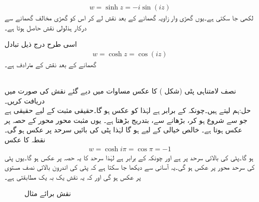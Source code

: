 \begin{align}\label{مساوات_نقش_ہذلولی_سائن_تفاعل}
w=\sinh z=-i\sin (iz)
\end{align}
لکھی جا سکتی ہے۔یوں گھڑی وار  زاویہ گھمانے  کے بعد نقش  لے کر اس کو گھڑی مخالف    گھمانے سے درکار ہذلولی نقش حاصل ہوتا ہے۔

اسی طرح درج ذیل تبادل
\begin{align}\label{مساوات_نقش_ہذلولی_کوسائن_تفاعل}
w=\cosh z=\cos (iz)
\end{align}
گھمانے  کے بعد نقش  کے مترادف ہے۔ 

\quad {}\\
نصف لامتناہی پٹی  (شکل ) کا عکس مساوات  میں دیے گئے نقش کی صورت میں دریافت کریں۔\\
حل:\quad ہم  لیتے ہیں۔چونکہ  کے برابر ہے لہٰذا  کو عکس  ہو گا۔حقیقی مثبت  کے لیے  حقیقی ہے جو  سے شروع ہو کر،  بڑھانے سے، بتدریج بڑھتا ہے۔ یوں مثبت محور  محور   کے حصہ  پر عکس ہوتا ہے۔ خالص خیالی  کے لیے  ہو گا لہٰذا پٹی کی بائیں سرحد  پر عکس ہو گی۔نقطہ  کا عکس
\begin{align*}
w=\cosh i\pi=\cos \pi=-1
\end{align*} 
ہو گا۔پٹی کی بالائی سرحد پر  ہے اور چونکہ  کے برابر ہے لہٰذا سرحد کا یہ حصہ  پر عکس ہو گا۔یوں پٹی کی سرحد محور   پر عکس ہو گی۔یہ آسانی سے دیکھا جا سکتا ہے کہ پٹی کی اندرون بالائی نصف  مستوی پر عکس ہو گی اور  کہ یہ نقش یک بہ یک مطابقتی ہے۔
\begin{figure}
\centering
\begin{subfigure}{0.45\textwidth}
\centering
{}
\end{subfigure} \hfill
\begin{subfigure}{0.45\textwidth}
\centering
{}
\end{subfigure} \hfill
\caption{نقش برائے مثال }
\label{شکل_مثال_نقش_ہذلولی_کوسائن_عکس-لامتناہی_پٹی}
\end{figure}
